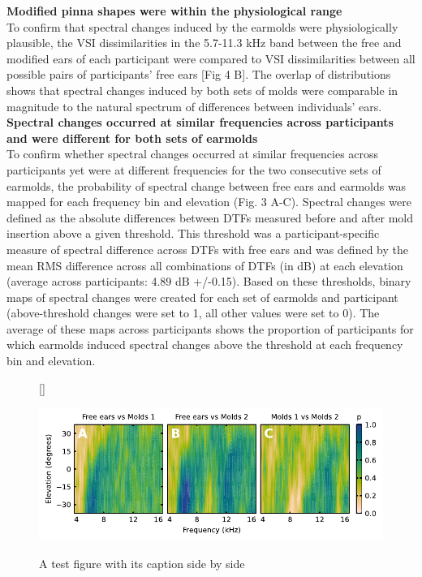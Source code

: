 \begin{multicols}{2}
\noindent %


\noindent\textbf{Modified pinna shapes were within the physiological range}\\
To confirm that spectral changes induced by the earmolds were physiologically plausible, the VSI dissimilarities in the 5.7-11.3 kHz band between the free and modified ears of each participant were compared to VSI dissimilarities between all possible pairs of participants’ free ears [Fig 4 B]. The overlap of distributions shows that spectral changes induced by both sets of molds were comparable in magnitude to the natural spectrum of differences between individuals’ ears.\\

\noindent\textbf{Spectral changes occurred at similar frequencies across participants and were different for both sets of earmolds}\\
To confirm whether spectral changes occurred at similar frequencies across participants yet were at different frequencies for the two consecutive sets of earmolds, the probability of spectral change between free ears and earmolds was mapped for each frequency bin and elevation (Fig. 3 A-C). Spectral changes were defined as the absolute differences between DTFs measured before and after mold insertion above a given threshold. This threshold was a participant-specific measure of spectral difference across DTFs with free ears and was defined by the mean RMS difference across all combinations of DTFs (in dB) at each elevation (average across participants: 4.89 dB +/-0.15). Based on these thresholds, binary maps of spectral changes were created for each set of earmolds and participant (above-threshold changes were set to 1, all other values were set to 0). The average of these maps across participants shows the proportion of participants for which earmolds induced spectral changes above the threshold at each frequency bin and elevation.\\

\end{multicols} %
\begin{figure}[hb]
[\FBwidth]
{\caption{A test figure with its caption side by side}\label{fig:test}}
{\includegraphics[width=13cm]{../Results/figures/spectral_change_p/spectral_change_p}}
\end{figure}
